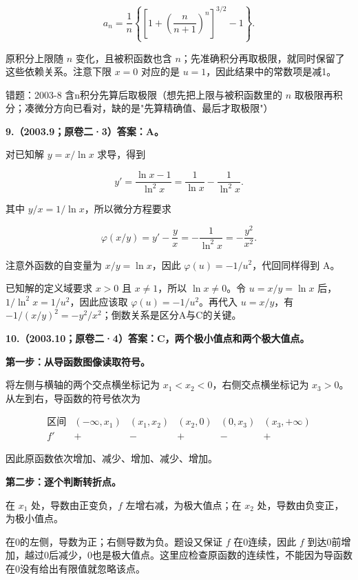 \documentclass[UTF8,11pt,fontset=windows]{ctexart}
\begin{document}
$$
a_n=\frac1n\left\{\left[1+\left(\frac n{n+1}\right)^n\right]^{3/2}-1\right\}.
$$

原积分上限随 $n$ 变化，且被积函数也含 $n$；先准确积分再取极限，就同时保留了这些依赖关系。注意下限 $x=0$ 对应的是 $u=1$，因此结果中的常数项是减1。

\begingroup\color{gray}错题：2003-8 含n积分先算后取极限（想先把上限与被积函数里的 $n$ 取极限再积分；凑微分方向已看对，缺的是"先算精确值、最后才取极限"）\par\endgroup

\clearpage

\textbf{9.（2003.9；原卷二·3）答案：A。}

对已知解 $y=x/\ln x$ 求导，得到

$$
y'=\frac{\ln x-1}{\ln^2x}
=\frac1{\ln x}-\frac1{\ln^2x}.
$$

其中 $y/x=1/\ln x$，所以微分方程要求

$$
\varphi(x/y)=y'-\frac yx=-\frac1{\ln^2x}=-\frac{y^2}{x^2}.
$$

注意外函数的自变量为 $x/y=\ln x$，因此 $\varphi(u)=-1/u^2$，代回同样得到 A。

已知解的定义域要求 $x>0$ 且 $x\ne1$，所以 $\ln x\ne0$。令 $u=x/y=\ln x$ 后，$1/\ln^2x=1/u^2$，因此应该取 $\varphi(u)=-1/u^2$。再代入 $u=x/y$，有 $-1/(x/y)^2=-y^2/x^2$；倒数关系是区分A与C的关键。

\clearpage

\textbf{10.（2003.10；原卷二·4）答案：C，两个极小值点和两个极大值点。}

\textbf{第一步：从导函数图像读取符号。}

将左侧与横轴的两个交点横坐标记为 $x_1<x_2<0$，右侧交点横坐标记为 $x_3>0$。从左到右，导函数的符号依次为

$$
\begin{array}{c|ccccc}
\text{区间}&(-\infty,x_1)&(x_1,x_2)&(x_2,0)&(0,x_3)&(x_3,+\infty)\\
\hline
f'&+&-&+&-&+
\end{array}
$$

因此原函数依次增加、减少、增加、减少、增加。

\textbf{第二步：逐个判断转折点。}

在 $x_1$ 处，导数由正变负，$f$ 左增右减，为极大值点；在 $x_2$ 处，导数由负变正，为极小值点。

在0的左侧，导数为正；右侧导数为负。题设又保证 $f$ 在0连续，因此 $f$ 到达0前增加，越过0后减少，0也是极大值点。这里应检查原函数的连续性，不能因为导函数在0没有给出有限值就忽略该点。
\end{document}
